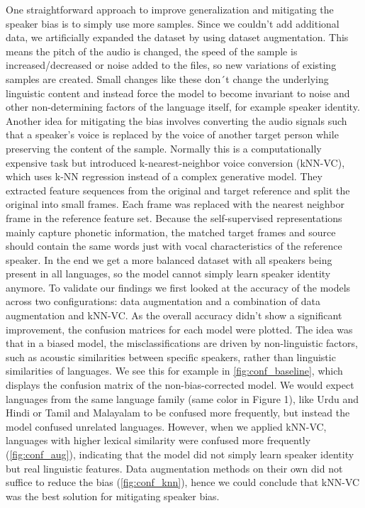 \documentclass[11pt]{article}
\begin{document}
 One straightforward approach to improve generalization and mitigating the speaker bias is to  simply use more samples. Since we couldn't add additional data, we artificially expanded the dataset by using dataset augmentation. This means the pitch of the audio is changed, the speed of the sample is increased/decreased or noise added to the files, so new variations of existing samples are created. Small changes like these don´t change the underlying linguistic content and instead force the model to become invariant to noise and other non-determining factors of the language itself, for example speaker identity. Another idea for mitigating the bias involves converting the audio signals such that a speaker's voice is replaced by the voice of another target person while preserving the content of the sample. Normally this is a computationally expensive task but \citet{baas2023knnvc} introduced k-nearest-neighbor voice conversion (kNN-VC), which uses k-NN regression instead of a complex generative model. They extracted feature sequences from the original and target reference and split the original into small frames. Each frame was replaced with the nearest neighbor frame in the reference feature set. Because the self-supervised representations mainly capture phonetic information, the matched target frames and source should contain the same words just with vocal characteristics of the reference speaker. In the end we get a more balanced dataset with all speakers being present in all languages, so the model cannot simply learn speaker identity anymore. To validate our findings we first looked at the accuracy of the models across two configurations:  data augmentation and a combination of data augmentation and kNN-VC. As the overall accuracy didn't show a significant improvement, the confusion matrices for each model were plotted. The idea was that in a biased model, the misclassifications are driven by non-linguistic factors, such as acoustic similarities between specific speakers, rather than linguistic similarities of languages. We see this for example in \ref{fig:conf_baseline}, which displays the confusion matrix of the non-bias-corrected model. We would expect languages from the same language family \citep{Indian_language_families} (same color in Figure 1), like Urdu and Hindi or Tamil and Malayalam to be confused more frequently, but instead the model confused unrelated languages. However, when we applied kNN-VC, languages with higher lexical similarity were confused more frequently (\ref{fig:conf_aug}), indicating that the model did not simply learn speaker identity but real linguistic features. Data augmentation methods on their own did not suffice to reduce the bias (\ref{fig:conf_knn}), hence we could conclude that  kNN-VC was the best solution for mitigating speaker bias.
\end{document}
